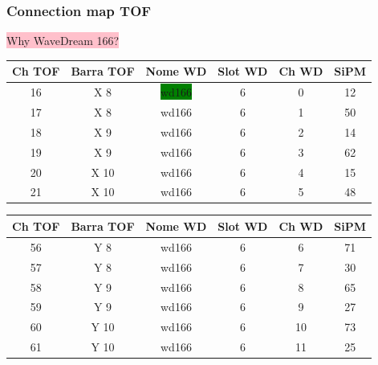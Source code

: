 \documentclass[9pt]{beamer}
\begin{document}
\begin{frame} [fragile]
\small
	\frametitle{Connection map TOF}
	
	\colorbox{pink}{Why WaveDream 166?}

\begin{center}
\begin{tabular}{ |c|c|c|c|c|c| } 
 	\hline
 	\textbf{Ch TOF} & \textbf{Barra TOF} & \textbf{Nome WD} & \textbf{Slot WD} & \textbf{Ch WD} & \textbf{SiPM}  \\
	 \hline
	 16 & X 8 & \colorbox{green}{wd166} & 6 & 0 & 12 \\ 
	 \hline
	 17 & X 8 & wd166 & 6 & 1 & 50 \\ 
	 \hline
	 18 & X 9 & wd166 & 6 & 2 & 14 \\ 
	 \hline
	 19 & X 9 & wd166 & 6 & 3 & 62 \\ 
	 \hline
	 20 & X 10 & wd166 & 6 & 4 & 15 \\ 
	 \hline
	 21 & X 10 & wd166 & 6 & 5 & 48 \\ 
	 \hline
\end{tabular}
\end{center}

\begin{center}
\begin{tabular}{ |c|c|c|c|c|c| } 
 	\hline
 	\textbf{Ch TOF} & \textbf{Barra TOF} & \textbf{Nome WD} & \textbf{Slot WD} & \textbf{Ch WD} & \textbf{SiPM}  \\
	 \hline
	 56 & Y 8 & wd166 & 6 & 6 & 71 \\ 
	 \hline
	 57 & Y 8 & wd166 & 6 & 7 & 30 \\ 
	 \hline
	 58 & Y 9 & wd166 & 6 & 8 & 65 \\ 
	 \hline
	 59 & Y 9 & wd166 & 6 & 9 & 27 \\ 
	 \hline
	 60 & Y 10 & wd166 & 6 & 10 & 73 \\ 
	 \hline
	 61 & Y 10 & wd166 & 6 & 11 & 25 \\ 
	 \hline
\end{tabular}
\end{center}

\end{frame}

\end{document}
